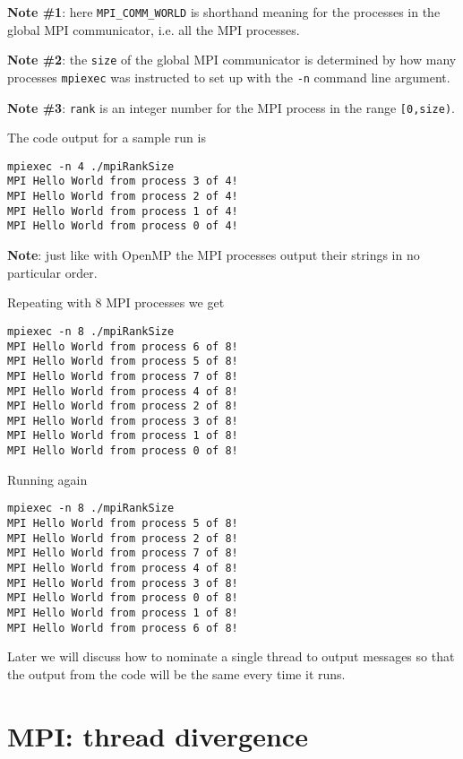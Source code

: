 {\bf Note \#1}: here \texttt{MPI\_COMM\_WORLD} is shorthand meaning for the processes in the global MPI communicator, i.e. all the MPI processes. 

{\bf Note \#2}: the \texttt{size} of the global MPI communicator is determined by how many processes \texttt{mpiexec} was instructed to set up with the \texttt{-n} command line argument. 

{\bf Note \#3}: \texttt{rank} is an integer number for the MPI process in the range \texttt{[0,size)}. 


The code output for a sample run is

\begin{Verbatim}[frame=single]
mpiexec -n 4 ./mpiRankSize
MPI Hello World from process 3 of 4!
MPI Hello World from process 2 of 4!
MPI Hello World from process 1 of 4!
MPI Hello World from process 0 of 4!
\end{Verbatim}
{\bf Note}: just like with OpenMP the MPI processes output their strings in no particular order. 

Repeating with 8 MPI processes we get

\begin{Verbatim}[frame=single]
mpiexec -n 8 ./mpiRankSize
MPI Hello World from process 6 of 8!
MPI Hello World from process 5 of 8!
MPI Hello World from process 7 of 8!
MPI Hello World from process 4 of 8!
MPI Hello World from process 2 of 8!
MPI Hello World from process 3 of 8!
MPI Hello World from process 1 of 8!
MPI Hello World from process 0 of 8!
\end{Verbatim}

Running again

\begin{Verbatim}[frame=single]
mpiexec -n 8 ./mpiRankSize
MPI Hello World from process 5 of 8!
MPI Hello World from process 2 of 8!
MPI Hello World from process 7 of 8!
MPI Hello World from process 4 of 8!
MPI Hello World from process 3 of 8!
MPI Hello World from process 0 of 8!
MPI Hello World from process 1 of 8!
MPI Hello World from process 6 of 8!
\end{Verbatim}

Later we will discuss how to nominate a single thread to output messages so that the output from the code will be the same every time it runs.

\section{MPI: thread divergence}

